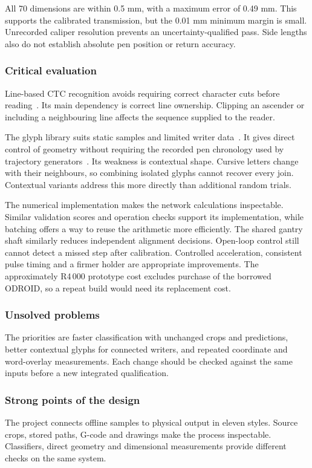 All 70 dimensions are within 0.5 mm, with a maximum error of 0.49 mm. This supports the calibrated transmission, but the 0.01 mm minimum margin is small. Unrecorded caliper resolution prevents an uncertainty-qualified pass. Side lengths also do not establish absolute pen position or return accuracy.

\subsubsection{Critical evaluation}
\label{sec:dis-choices}
Line-based CTC recognition avoids requiring correct character cuts before reading~\cite[pp.~2--3]{graves2006}. Its main dependency is correct line ownership. Clipping an ascender or including a neighbouring line affects the sequence supplied to the reader.

The glyph library suits static samples and limited writer data~\cite[p.~4]{haines2016}. It gives direct control of geometry without requiring the recorded pen chronology used by trajectory generators~\cite[p.~18]{graves2013}. Its weakness is contextual shape. Cursive letters change with their neighbours, so combining isolated glyphs cannot recover every join. Contextual variants address this more directly than additional random trials.

The numerical implementation makes the network calculations inspectable. Similar validation scores and operation checks support its implementation, while batching offers a way to reuse the arithmetic more efficiently. The shared gantry shaft similarly reduces independent alignment decisions. Open-loop control still cannot detect a missed step after calibration. Controlled acceleration, consistent pulse timing and a firmer holder are appropriate improvements. The approximately R4\,000 prototype cost excludes purchase of the borrowed ODROID, so a repeat build would need its replacement cost.

\subsubsection{Unsolved problems}
\label{sec:dis-unsolved}
The priorities are faster classification with unchanged crops and predictions, better contextual glyphs for connected writers, and repeated coordinate and word-overlay measurements. Each change should be checked against the same inputs before a new integrated qualification.

\subsubsection{Strong points of the design}
\label{sec:dis-strengths}
The project connects offline samples to physical output in eleven styles. Source crops, stored paths, G-code and drawings make the process inspectable. Classifiers, direct geometry and dimensional measurements provide different checks on the same system.

